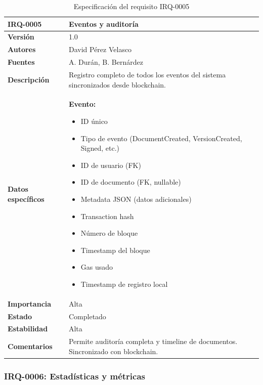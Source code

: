 \documentclass[11pt, a4paper]{article}
\begin{document}
\begin{table}[H]
    \centering
    \small
    \begin{tabular}{|p{4cm}|p{10cm}|}
    \hline
    \textbf{IRQ-0005} & Eventos y auditoría \\
    \hline
    \textbf{Versión} & 1.0 \\
    \hline
    \textbf{Autores} & David Pérez Velasco \\
    \hline
    \textbf{Fuentes} & A. Durán, B. Bernárdez \\
    \hline
    \textbf{Descripción} & Registro completo de todos los eventos del sistema sincronizados desde blockchain. \\
    \hline
    \textbf{Datos específicos} & 
    \textbf{Evento:}
    \begin{itemize}
        \item ID único
        \item Tipo de evento (DocumentCreated, VersionCreated, Signed, etc.)
        \item ID de usuario (FK)
        \item ID de documento (FK, nullable)
        \item Metadata JSON (datos adicionales)
        \item Transaction hash
        \item Número de bloque
        \item Timestamp del bloque
        \item Gas usado
        \item Timestamp de registro local
    \end{itemize} \\
    \hline
    \textbf{Importancia} & Alta \\
    \hline
    \textbf{Estado} & Completado \\
    \hline
    \textbf{Estabilidad} & Alta \\
    \hline
    \textbf{Comentarios} & Permite auditoría completa y timeline de documentos. Sincronizado con blockchain. \\
    \hline
    \end{tabular}
    \caption{Especificación del requisito IRQ-0005}
\end{table}

\subsubsection{IRQ-0006: Estadísticas y métricas}
\end{document}
